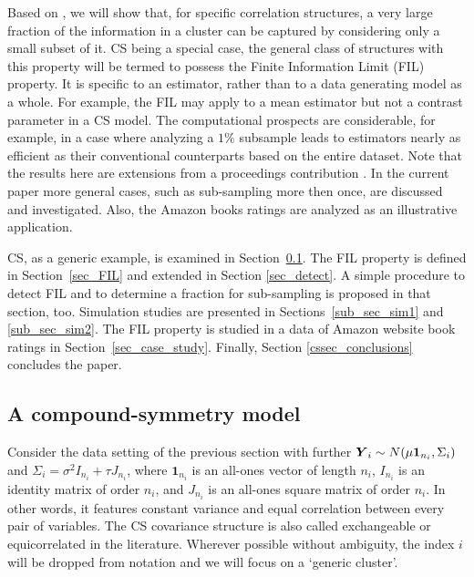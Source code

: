 \documentclass[11pt,a5paper,twoside]{book}
\newcommand{\BY}{\mbox{\boldmath $Y$}}
\begin{document}
Based on \cite{faes2009}, we will show that, for specific correlation structures, a very large fraction of the information in a cluster can be captured by considering only a small subset of it. CS being a special case, the general class of structures with this property will be termed to possess the {Finite Information Limit (FIL)\/} property. It is specific to an estimator, rather than to a data generating model as a whole. For example, the FIL may apply to a mean estimator but not a contrast parameter in a CS model. The computational prospects are considerable, for example, in a case where analyzing a $1\%$ subsample leads to estimators nearly as efficient as their conventional counterparts based on the entire dataset. Note that the results here are extensions from a proceedings contribution \cite{nassiri2016}. In the current paper more general cases, such as sub-sampling more then once, are discussed and investigated. Also, the Amazon books ratings are analyzed as an illustrative application.

CS, as a generic example, is examined in Section~\ref{sec_CS_effect}. The FIL property is defined in Section~\ref{sec_FIL} and  extended in Section \ref{sec_detect}. A simple procedure to detect FIL and to determine a fraction for sub-sampling is proposed in that section, too. Simulation studies are presented in Sections~\ref{sub_sec_sim1} and \ref{sub_sec_sim2}. The FIL property is studied in a data of Amazon website book ratings in Section~\ref{sec_case_study}. Finally, Section \ref{cssec_conclusions} concludes the paper.


\subsection{A compound-symmetry model}
\label{sec_CS_effect}
Consider the data setting of the previous section with further  $\BY_i\sim N(\mu \mathbf{1}_{n_i},\Sigma_i)$ and $\Sigma_i=\sigma^2I_{n_i}+\tau J_{n_i}$, where $\mathbf{1}_{n_i}$ is an all-ones vector of length $n_i$, $I_{n_i}$ is an identity matrix of order $n_i$, and $J_{n_i}$ is an all-ones square matrix of order $n_i$. In other words, it features constant variance and equal correlation between every pair of variables. The CS covariance structure is also called exchangeable or equicorrelated in the literature.  Wherever possible without ambiguity, the index $i$ will be dropped from notation and we will focus on a `generic cluster'.  
\end{document}
